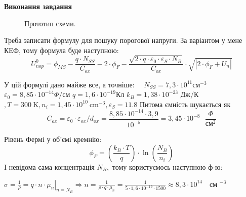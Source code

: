 \documentclass[a4paper,14pt]{extreport}
\begin{document}
\begin{center}
  \textbf{Виконання завдання}
\end{center}

\begin{figure}[h!]
\caption{Прототип схеми.}
\label{ris1}
\end{figure}

Треба записати формулу для пошуку порогової напруги. За варіантом  у мене КЕФ, тому формула буде наступною:
\begin{equation}
U_{n o p}^{0}=\phi_{M S}-\frac{q \cdot N_{S S}}{C_{o x}}-2 \cdot \phi_{F}-\frac{\sqrt{2 \cdot q \cdot \varepsilon_{0} \cdot \varepsilon_{S} \cdot N_{B}}}{C_{o x}} \cdot \sqrt{\left|2 \cdot \phi_{F}+U_{n}\right|}
\end{equation}

У цій формулі
дано майже все, а точніше: $\quad N_{S S}=7,3 \cdot 10^{11} \text{см}^{-3}$
$\varepsilon_{0}=8,85 \cdot 10^{-14} \Phi / \text{см}$
$q=1,6 \cdot 10^{-19}\text{Кл}$
$k_{B}=1,38 \cdot 10^{-23}$ Дж/К $, T=300 \mathrm{~K}, n_{i}=1,45 \cdot 10^{10} \mathrm{~cm}^{-3}, \varepsilon_{S}=11.8$
Питома ємність шукається як
\begin{equation}
C_{o x}=\varepsilon_{0} \cdot \varepsilon_{o x} / d_{o x}=\frac{8,85 \cdot 10^{-14} \cdot 3,9}{10^{-5}}=3,45 \cdot 10^{-8}\text{ } \frac{\Phi}{\text{см}^{2}}
\end{equation}

Рівень Фермі у об'ємі кремнію:
\begin{equation}
\phi_{F}=\left(\frac{k_{B} \cdot T}{q}\right) \cdot \ln \left(\frac{N_{B}}{n_{i}}\right)
\end{equation}
I невідома сама концентрація $N_{B},$ тому користуємось наступною ф-ю:



\vspace{0.5 cm}
$\sigma=\frac{1}{\rho}=\left.q \cdot n \cdot \mu_{n}\right|_{n=N_{B}} \Rightarrow n=\frac{1}{\rho \cdot q \cdot \mu_{n}}=\frac{1}{5 \cdot 1,6 \cdot 10^{-19} \cdot 1500} \approx 8,3 \cdot 10^{14} \text{ }$ см $^{-3}$
\vspace{0.5 cm}
\end{document}
